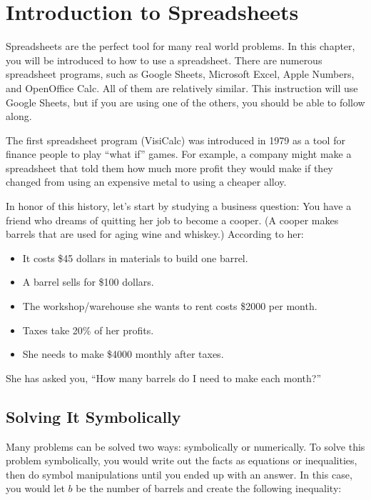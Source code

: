 \chapter{Introduction to Spreadsheets}

Spreadsheets are the perfect
tool for many real world problems. In this chapter, you will be introduced to how to use a
spreadsheet. There are numerous spreadsheet programs, such as Google Sheets,
Microsoft Excel, Apple Numbers, and OpenOffice Calc.  All of them are
relatively similar. This instruction will use Google Sheets, but if you are using one
of the others, you should be able to follow along.

The first spreadsheet program (VisiCalc) was introduced in 1979 as a
tool for finance people to play ``what if'' games.  For example, a
company might make a spreadsheet that told them how much more profit
they would make if they changed from using an expensive metal to using
a cheaper alloy.

In honor of this history, let's start by studying a business question:
You have a friend who dreams of quitting her job to become a cooper. (A
cooper makes barrels that are used for aging wine and whiskey.)  According to her:
\begin{itemize}
\item It costs \$45 dollars in materials to build one barrel.
\item A barrel sells for \$100 dollars.
\item The workshop/warehouse she wants to rent costs \$2000 per month.
\item Taxes take 20\% of her profits.
\item She needs to make \$4000 monthly after taxes.
\end{itemize}

She has asked you, ``How many barrels do I need to make each month?''


\section{Solving It Symbolically}

Many problems can be solved two ways: symbolically or
numerically. To solve this
problem symbolically, you would write out the facts as equations or
inequalities, then do symbol manipulations until you ended up with
an answer. In this case, you would let $b$ be the number of barrels
and create the following inequality:

